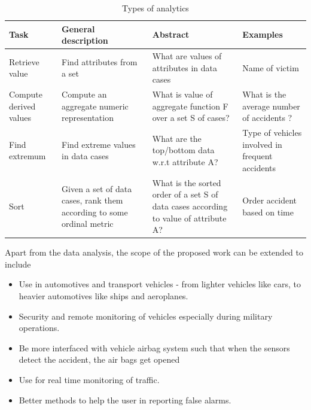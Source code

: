 \begin{table}[!ht]
	\centering
	\begin{tabular}{| m{4em} | m{6em}| m{7em} | m{8em} |} 
		\hline
		\textbf{Task} & \textbf{General description} & \textbf{Abstract} & \textbf{Examples} \\ 
		\hline
		Retrieve value & Find attributes from a set & What are values of attributes in data cases & Name of victim\\ 
		\hline
		Compute derived values & Compute an aggregate numeric representation & What is value of aggregate function F over a set S of cases? & What is the average number of accidents ? \\ 
		\hline
		Find extremum & Find extreme values in data cases & What are the top/bottom data w.r.t attribute A? & Type of vehicles involved in frequent accidents \\
		\hline
		Sort & Given a set of data cases, rank them according to some ordinal metric & What is the sorted order of a set S of data cases according to value of attribute A? & Order accident based on time \\
		\hline
	\end{tabular}
	\caption{Types of analytics}
\end{table}

Apart from the data analysis, the scope of the proposed work can be extended to include \\
\begin{itemize}
	\item Use in automotives and transport vehicles - from lighter vehicles like cars, to heavier automotives like ships and aeroplanes.
	\item Security and remote monitoring of vehicles especially during military operations. 
	\item Be more interfaced with vehicle airbag system such that when the sensors detect the accident, the air bags get opened
	\item Use for real time monitoring of traffic.
	\item Better methods to help the user in reporting false alarms.
\end{itemize}

